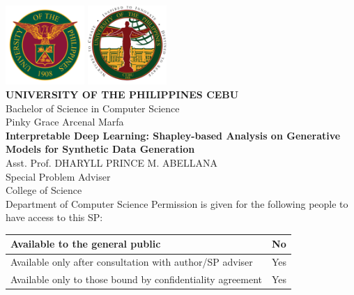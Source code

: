 \documentclass{article}
\begin{document}
\begin{titlepage}
    \centering
    \includegraphics[height=3cm]{assets/up-logo.png}
    \includegraphics[height=3cm]{assets/upc-logo.png} \\ [0.5cm]

    \Large \textbf{UNIVERSITY OF THE PHILIPPINES CEBU} \\
    \large Bachelor of Science in Computer Science \\
    \vfill
    \large Pinky Grace Arcenal Marfa \\
    \vfill
    \large \textbf{Interpretable Deep Learning: Shapley-based Analysis on Generative Models for Synthetic Data Generation}\\
    \vfill
    \large Asst. Prof. DHARYLL PRINCE M. ABELLANA \\
    \large Special Problem Adviser \\
    \vfill
    \large College of Science \\
    \large Department of Computer Science
    \vfill
    \large Permission is given for the following people to have access to this SP:

\begin{table}[H]
    \centering
    \renewcommand{\arraystretch}{0.8} %
    \begin{tabular}{|>{\centering\arraybackslash}m{}|>{\centering\arraybackslash}m{}|}
        \hline
        Available to the general public & No \\ \hline
        Available only after consultation with author/SP adviser & Yes \\ \hline
        Available only to those bound by confidentiality agreement & Yes \\ \hline
    \end{tabular}
\end{table}


\end{titlepage}
\end{document}
